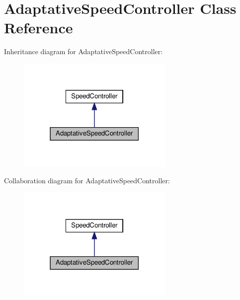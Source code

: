 \hypertarget{classAdaptativeSpeedController}{}\section{Adaptative\+Speed\+Controller Class Reference}
\label{classAdaptativeSpeedController}


Inheritance diagram for Adaptative\+Speed\+Controller\+:
\nopagebreak
\begin{figure}[H]
\begin{center}
\leavevmode
\includegraphics[width=213pt]{classAdaptativeSpeedController__inherit__graph}
\end{center}
\end{figure}


Collaboration diagram for Adaptative\+Speed\+Controller\+:
\nopagebreak
\begin{figure}[H]
\begin{center}
\leavevmode
\includegraphics[width=213pt]{classAdaptativeSpeedController__coll__graph}
\end{center}
\end{figure}
